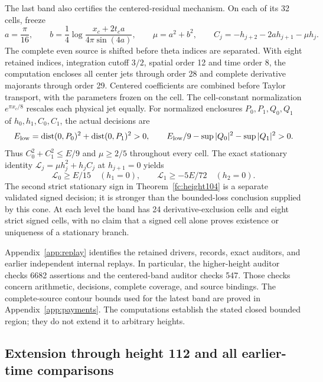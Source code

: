 \documentclass[11pt]{article}
\numberwithin{equation}{section}
\theoremstyle{definition}
\theoremstyle{remark}
\begin{document}
The last band also certifies the centered-residual mechanism.  On each
of its 32 cells, freeze
\[
 a=\frac\pi{16},\qquad
 b=\frac14\log\frac{x_c+2t_ca}{4\pi\sin(4a)},\qquad
 \mu=a^2+b^2,
 \qquad C_j=-h_{j+2}-2ah_{j+1}-\mu h_j.
\]
The complete even source is shifted before theta indices are separated.
With eight retained indices, integration cutoff $3/2$, spatial order
12 and time order 8, the computation encloses all center jets through
order 28 and complete derivative majorants through order 29.
Centered coefficients are combined before Taylor transport, with
the parameters frozen on the cell.  The cell-constant normalization
$e^{\pi x_c/8}$ rescales each physical jet equally.
For normalized enclosures $P_0,P_1,Q_0,Q_1$ of $h_0,h_1,C_0,C_1$,
the actual decisions are
\[
 E_{\rm low}=\operatorname{dist}(0,P_0)^2+
 \operatorname{dist}(0,P_1)^2>0,\qquad
 E_{\rm low}/9-\sup|Q_0|^2-\sup|Q_1|^2>0.
\]
Thus $C_0^2+C_1^2\le E/9$ and $\mu\ge2/5$ throughout every cell.
The exact stationary identity
$\mathcal L_j=\mu h_j^2+h_jC_j$ at $h_{j+1}=0$ yields
\[
 \mathcal L_0\ge E/15\quad(h_1=0),\qquad
 \mathcal L_1\ge-5E/72\quad(h_2=0).
\]
The second strict stationary sign in
Theorem~\ref{fc:height104} is a separate validated signed decision;
it is stronger than the bounded-loss conclusion supplied by this cone.
At each level the band has 24 derivative-exclusion cells and eight
strict signed cells, with no claim that a signed cell alone proves
existence or uniqueness of a stationary branch.

Appendix~\ref{app:replay} identifies the retained drivers, records,
exact auditors, and earlier independent internal replays. In particular,
the higher-height auditor checks 6682 assertions and the centered-band
auditor checks 547. Those checks concern arithmetic, decisions, complete
coverage, and source bindings. The complete-source contour bounds used
for the latest band are proved in Appendix~\ref{app:payments}.
The computations establish the stated closed bounded region; they do
not extend it to arbitrary heights.



\subsection{Extension through height 112 and all earlier-time comparisons}
\label{subsec:height112}
\end{document}
